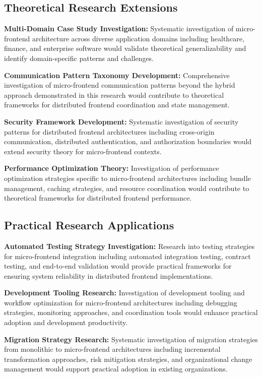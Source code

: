 \documentclass[12pt,a4paper]{report}
\begin{document}
\subsection{Theoretical Research Extensions}

\textbf{Multi-Domain Case Study Investigation:} Systematic investigation of micro-frontend architecture across diverse application domains including healthcare, finance, and enterprise software would validate theoretical generalizability and identify domain-specific patterns and challenges.

\textbf{Communication Pattern Taxonomy Development:} Comprehensive investigation of micro-frontend communication patterns beyond the hybrid approach demonstrated in this research would contribute to theoretical frameworks for distributed frontend coordination and state management.

\textbf{Security Framework Development:} Systematic investigation of security patterns for distributed frontend architectures including cross-origin communication, distributed authentication, and authorization boundaries would extend security theory for micro-frontend contexts.

\textbf{Performance Optimization Theory:} Investigation of performance optimization strategies specific to micro-frontend architectures including bundle management, caching strategies, and resource coordination would contribute to theoretical frameworks for distributed frontend performance.

\subsection{Practical Research Applications}

\textbf{Automated Testing Strategy Investigation:} Research into testing strategies for micro-frontend integration including automated integration testing, contract testing, and end-to-end validation would provide practical frameworks for ensuring system reliability in distributed frontend implementations.

\textbf{Development Tooling Research:} Investigation of development tooling and workflow optimization for micro-frontend architectures including debugging strategies, monitoring approaches, and coordination tools would enhance practical adoption and development productivity.

\textbf{Migration Strategy Research:} Systematic investigation of migration strategies from monolithic to micro-frontend architectures including incremental transformation approaches, risk mitigation strategies, and organizational change management would support practical adoption in existing organizations.
\end{document}
